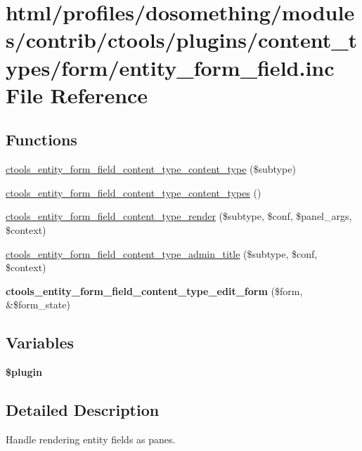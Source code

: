 \hypertarget{entity__form__field_8inc}{
\section{html/profiles/dosomething/modules/contrib/ctools/plugins/content\_\-types/form/entity\_\-form\_\-field.inc File Reference}
\label{entity__form__field_8inc}
}
\subsection*{Functions}
\begin{DoxyCompactItemize}
\item 
\hyperlink{entity__form__field_8inc_a4540ac87ce6d27ada4a5ceca0c714d2e}{ctools\_\-entity\_\-form\_\-field\_\-content\_\-type\_\-content\_\-type} (\$subtype)
\item 
\hyperlink{entity__form__field_8inc_a866a842a6cc10bf97b1394f9dc4e69fe}{ctools\_\-entity\_\-form\_\-field\_\-content\_\-type\_\-content\_\-types} ()
\item 
\hyperlink{entity__form__field_8inc_a0e49ac26ff05165b033b71cb46379573}{ctools\_\-entity\_\-form\_\-field\_\-content\_\-type\_\-render} (\$subtype, \$conf, \$panel\_\-args, \$context)
\item 
\hyperlink{entity__form__field_8inc_a90bcb2feef9424968acf0cc58e6a27fa}{ctools\_\-entity\_\-form\_\-field\_\-content\_\-type\_\-admin\_\-title} (\$subtype, \$conf, \$context)
\item 
\hypertarget{entity__form__field_8inc_a0a455d3b70b6876e57600c5f7a779ae3}{
{\bfseries ctools\_\-entity\_\-form\_\-field\_\-content\_\-type\_\-edit\_\-form} (\$form, \&\$form\_\-state)}
\label{entity__form__field_8inc_a0a455d3b70b6876e57600c5f7a779ae3}

\end{DoxyCompactItemize}
\subsection*{Variables}
\begin{DoxyCompactItemize}
\item 
{\bfseries \$plugin}
\end{DoxyCompactItemize}


\subsection{Detailed Description}
Handle rendering entity fields as panes. 

